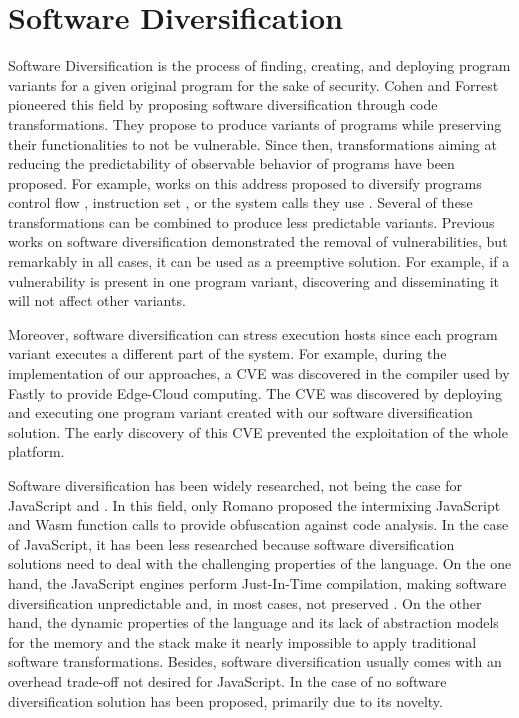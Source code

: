 \section{Software Diversification}

Software Diversification is the process of finding, creating, and deploying program variants for a given original program \cite{okhravi2013survey} for the sake of security.
Cohen \etal \cite{cohen1993operating} and Forrest \etal \cite{595185} pioneered this field by proposing software diversification through code transformations. 
They propose to produce variants of programs while preserving their functionalities to not be vulnerable.
Since then, transformations aiming at reducing the predictability of observable behavior of programs have been proposed. For example, works on this address proposed to diversify programs control flow \cite{davi2015isomeron}, instruction set \cite{barrantes2003randomized}, or the system calls they use \cite{Chew02mitigatingbuffer}. 
Several of these transformations can be combined to produce less predictable variants.
Previous works on software diversification demonstrated the removal of vulnerabilities, but remarkably in all cases, it can be used as a preemptive solution.
For example, if a vulnerability is present in one program variant, discovering and disseminating it will not affect other variants.

Moreover, software diversification can stress execution hosts since each program variant executes a different part of the system. For example, during the implementation of our approaches, a CVE \cite{CVE} was discovered in the compiler used by Fastly to provide Edge-Cloud computing.
The CVE was discovered by deploying and executing one program variant created with our software diversification solution.
The early discovery of this CVE prevented the exploitation of the whole platform.


Software diversification has been widely researched, not being the case for JavaScript and \wasm.
In this field, only Romano \etal \cite{wobfuscator} proposed the intermixing JavaScript and Wasm function calls to provide obfuscation against code analysis. 
In the case of JavaScript, it has been less researched because software diversification solutions need to deal with the challenging properties of the language.
On the one hand, the JavaScript engines perform Just-In-Time compilation, making software diversification unpredictable and, in most cases, not preserved \cite{STRAC}.
On the other hand, the dynamic properties of the language and its lack of abstraction models for the memory and the stack make it nearly impossible to apply traditional software transformations.
Besides, software diversification usually comes with an overhead trade-off not desired for JavaScript. 
In the case of \wasm no software diversification solution has been proposed, primarily due to its novelty.






